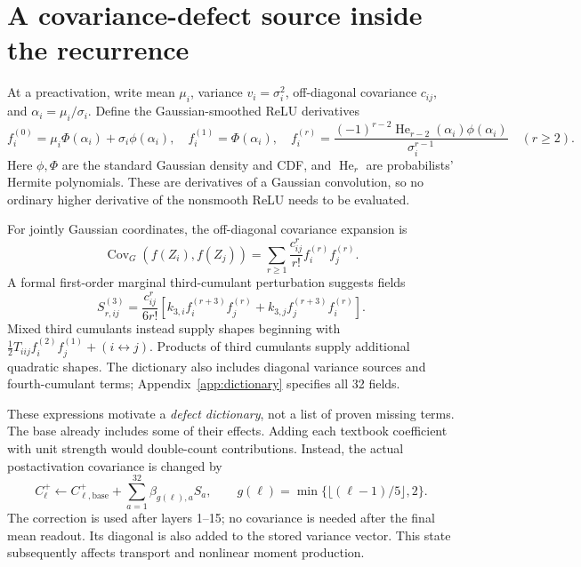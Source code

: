 \documentclass[10pt]{article}
\newcommand{\Cov}{\operatorname{Cov}}
\newcommand{\sectionpage}[1]{\clearpage\section{#1}}
\begin{document}
\sectionpage{A covariance-defect source inside the recurrence}
At a preactivation, write mean \(\mu_i\), variance \(v_i=\sigma_i^2\),
off-diagonal covariance \(c_{ij}\), and \(\alpha_i=\mu_i/\sigma_i\).
Define the Gaussian-smoothed ReLU derivatives
\begin{equation}\label{eq:derivatives}
 f_i^{(0)}=\mu_i\Phi(\alpha_i)+\sigma_i\phi(\alpha_i),\quad
 f_i^{(1)}=\Phi(\alpha_i),\quad
 f_i^{(r)}=\frac{(-1)^{r-2}\operatorname{He}_{r-2}(\alpha_i)
 \phi(\alpha_i)}{\sigma_i^{r-1}}\quad(r\ge2).
\end{equation}
Here \(\phi,\Phi\) are the standard Gaussian density and CDF, and
\(\operatorname{He}_r\) are probabilists' Hermite polynomials. These are
derivatives of a Gaussian convolution, so no ordinary higher derivative of
the nonsmooth ReLU needs to be evaluated.

For jointly Gaussian coordinates, the off-diagonal covariance expansion is
\begin{equation}\label{eq:gauss}
 \Cov_G(f(Z_i),f(Z_j))=
 \sum_{r\ge1}\frac{c_{ij}^{r}}{r!}f_i^{(r)}f_j^{(r)}.
\end{equation}
A formal first-order marginal third-cumulant perturbation suggests fields
\begin{equation}\label{eq:s3}
 S^{(3)}_{r,ij}=\frac{c_{ij}^{r}}{6r!}
 \left[k_{3,i} f_i^{(r+3)}f_j^{(r)}+
       k_{3,j} f_j^{(r+3)}f_i^{(r)}\right].
\end{equation}
Mixed third cumulants instead supply shapes beginning with
\(\tfrac12 T_{iij}f_i^{(2)}f_j^{(1)}+(i\leftrightarrow j)\).
Products of third cumulants supply additional quadratic shapes. The
dictionary also includes diagonal variance sources and fourth-cumulant
terms; Appendix~\ref{app:dictionary} specifies all 32 fields.

These expressions motivate a \emph{defect dictionary}, not a list of proven
missing terms. The base already includes some of their effects. Adding each
textbook coefficient with unit strength would double-count contributions.
Instead, the actual postactivation covariance is changed by
\begin{equation}\label{eq:covupdate}
 C_\ell^+\leftarrow C_{\ell,\mathrm{base}}^+
       +\sum_{a=1}^{32}\beta_{g(\ell),a}S_a,\qquad
 g(\ell)=\min\{\lfloor(\ell-1)/5\rfloor,2\}.
\end{equation}
The correction is used after layers 1--15; no covariance is needed after the
final mean readout. Its diagonal is also added to the stored variance vector.
This state subsequently affects transport and nonlinear moment production.
\end{document}

